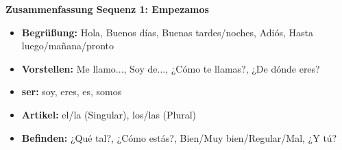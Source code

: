 \documentclass[11pt, a4paper]{article}
\begin{document}
\vspace{15pt}

\noindent\textbf{Zusammenfassung Sequenz 1: Empezamos}

\begin{itemize}
    \item \textbf{Begrüßung:} Hola, Buenos días, Buenas tardes/noches, Adiós, Hasta luego/mañana/pronto
    \item \textbf{Vorstellen:} Me llamo..., Soy de..., ¿Cómo te llamas?, ¿De dónde eres?
    \item \textbf{ser:} soy, eres, es, somos
    \item \textbf{Artikel:} el/la (Singular), los/las (Plural)
    \item \textbf{Befinden:} ¿Qué tal?, ¿Cómo estás?, Bien/Muy bien/Regular/Mal, ¿Y tú?
\end{itemize}
\end{document}
